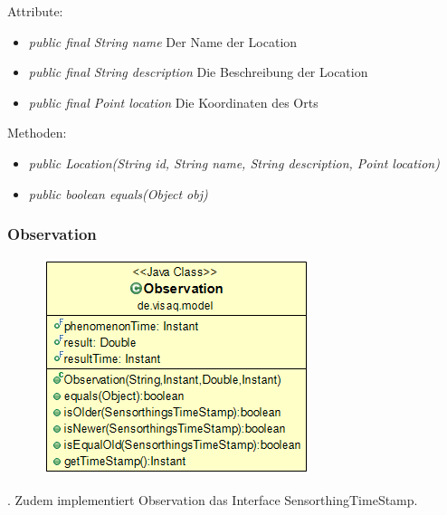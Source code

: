 Attribute:
\begin{itemize} 
	\item \emph{public final String name} Der Name der Location
	\item \emph{public final String description} Die Beschreibung der Location
	\item \emph{public final Point location} Die Koordinaten des Orts
\end{itemize}
Methoden:
\begin{itemize} 
	\item \emph{public Location(String id, String name, String description, Point location)} 
	\item \emph{public boolean equals(Object obj)} 
\end{itemize}


\subsubsection {Observation}
\begin{minipage}{0.3\textwidth}
	\begin{figure}[H]
		\includegraphics[scale = 0.5
		]{media/frontend/model/Observation_Class.png}
	\end{figure}
\end{minipage} \hfill
\begin{minipage}{0.6\textwidth}
	. Zudem implementiert Observation das Interface SensorthingTimeStamp.
\end{minipage}

